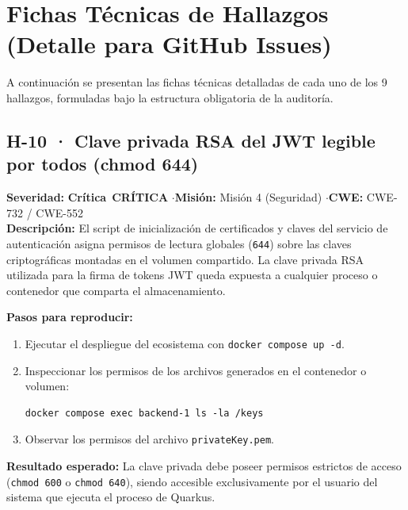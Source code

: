 \documentclass[10pt,a4paper]{article}
\newcommand{\code}[1]{\nolinkurl{#1}}
\newcommand{\badgeCritica}{\colorbox{red!20}{\textcolor{red!80!black}{\textbf{\footnotesize Crítica}}}}
\begin{document}
\newpage
\section{Fichas Técnicas de Hallazgos (Detalle para GitHub Issues)}

A continuación se presentan las fichas técnicas detalladas de cada uno de los 9 hallazgos, formuladas bajo la estructura obligatoria de la auditoría.

\subsection{H-10 · Clave privada RSA del JWT legible por todos (chmod 644)}
\noindent\textbf{Severidad:} \badgeCritica\ \textbf{CRÍTICA} \quad$\cdot$\quad \textbf{Misión:} Misión 4 (Seguridad) \quad$\cdot$\quad \textbf{CWE:} CWE-732 / CWE-552\\[0.3em]

\noindent\textbf{Descripción:}
El script de inicialización de certificados y claves del servicio de autenticación asigna permisos de lectura globales (\code{644}) sobre las claves criptográficas montadas en el volumen compartido. La clave privada RSA utilizada para la firma de tokens JWT queda expuesta a cualquier proceso o contenedor que comparta el almacenamiento.

\noindent\textbf{Pasos para reproducir:}
\begin{enumerate}[leftmargin=*]
    \item Ejecutar el despliegue del ecosistema con \code{docker compose up -d}.
    \item Inspeccionar los permisos de los archivos generados en el contenedor o volumen:
    \begin{tcolorbox}[colback=codebg,colframe=gray!40,arc=1mm]\small
\begin{verbatim}
docker compose exec backend-1 ls -la /keys
\end{verbatim}
    \end{tcolorbox}
    \item Observar los permisos del archivo \code{privateKey.pem}.
\end{enumerate}

\noindent\textbf{Resultado esperado:}
La clave privada debe poseer permisos estrictos de acceso (\code{chmod 600} o \code{chmod 640}), siendo accesible exclusivamente por el usuario del sistema que ejecuta el proceso de Quarkus.
\end{document}
